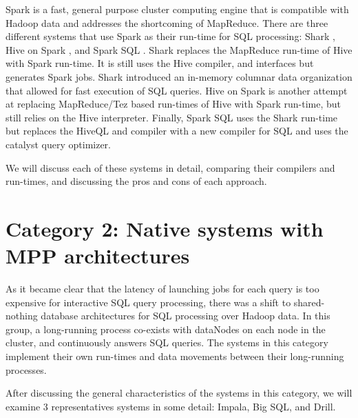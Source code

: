 \documentclass{vldb}
\begin{document}
Spark is a fast, general purpose cluster computing engine that is compatible with Hadoop data and addresses the shortcoming of MapReduce. There are three different systems that use Spark as their run-time for SQL processing: Shark \cite{sharksigmod13}, Hive on Spark \cite{hiveOnSpark}, and Spark SQL \cite{sparkSQL}. Shark replaces the MapReduce run-time of Hive \cite{hive} with Spark run-time. It is still uses the Hive compiler, and interfaces but generates Spark jobs. Shark introduced an in-memory columnar data organization that allowed for fast execution of SQL queries. Hive on Spark is another attempt at replacing MapReduce/Tez based run-times of Hive with Spark run-time, but still relies on the Hive interpreter. Finally, Spark SQL uses the Shark \cite{sharksigmod13} run-time but replaces the HiveQL and compiler with a new compiler for SQL and uses the catalyst query optimizer.

We will discuss each of these systems in detail, comparing their compilers and run-times, and discussing the pros and cons of each approach.


\section{Category 2: Native systems with MPP architectures}

As it became clear that the latency of launching jobs for each query is too expensive for interactive SQL query processing, there was a shift to shared-nothing database architectures for SQL processing over Hadoop data. In this group, a long-running process co-exists with dataNodes on each node in the cluster, and continuously answers SQL queries. The systems in this category implement their own run-times and data movements between their long-running processes. 

After discussing the general characteristics of the systems in this category, we will examine 3 representatives systems in some detail: Impala, Big SQL, and Drill. 
\end{document}
